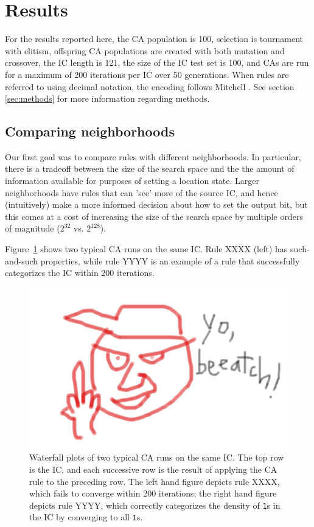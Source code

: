 \section{Results} \label{results}

For the results reported here, the CA population is 100, selection is tournament with elitism, offspring CA populations are created with both 
mutation and crossover, the IC length is 121, the size of the IC test set is 100, and CAs are run for a maximum of 
200 iterations per IC over 50 generations. When rules are referred to using decimal notation, the encoding follows Mitchell 
\cite{Mitchell:1994:ECA:186092.186116}. See section \ref{sec:methods} 
for more information regarding methods.

\subsection{Comparing neighborhoods} \label{sec:2_1}
Our first goal was to compare rules with different neighborhoods. In particular, there is a tradeoff between the size of the search space and the 
the amount of information available for purposes of setting a location state. Larger neighborhoods have rules that can 'see' more of the source IC, and 
hence (intuitively) make a more informed decision about how to set the output bit, but this comes at a cost of increasing the size of the search space by multiple 
orders of magnitude ($2^{32}$ vs. $2^{128}$).

Figure~\ref{fig:waterfall} shows two typical CA runs on the same IC. Rule XXXX (left) has such-and-such properties, while rule YYYY is an example of a rule that successfully categorizes the IC within 200 iterations.
\begin{figure}
\begin{center}
\includegraphics[width=\linewidth]{foo.png}
\caption{Waterfall plots of two typical CA runs on the same IC. The top row is the IC, and each successive row is the result of applying the CA rule 
to the preceding row. The left hand figure depicts rule XXXX, which fails to converge within 200 iterations; the right hand figure depicts rule YYYY, 
which correctly categorizes the density of \texttt{1}s in the IC by converging to all \texttt{1}s.}
\label{fig:waterfall}
\end{center}
\end{figure}

